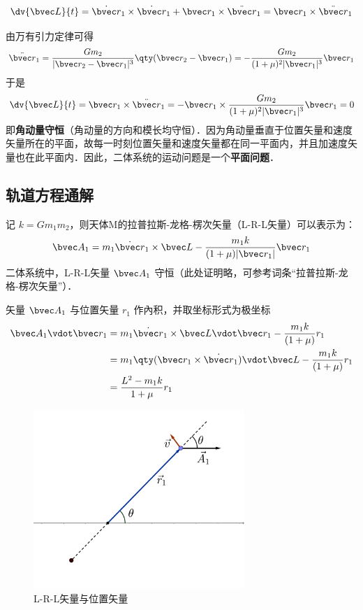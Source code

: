 \begin{equation}
\dv{\bvec L}{t} = \dot{\bvec r}_1 \times \dot{\bvec r}_1 + \bvec r_1 \times \ddot{\bvec r}_1=\bvec r_1 \times \ddot{\bvec r}_1
\end{equation}

由万有引力定律可得
\begin{equation}\label{ConDB_eq4}
\ddot{\bvec r}_1 = \frac{Gm_2}{|\bvec r_2 - \bvec r_1|^3} \qty(\bvec r_2 - \bvec r_1) = - \frac{Gm_2}{(1+\mu)^2|\bvec r_1|^3}\bvec r_1
\end{equation}
于是
\begin{equation}
\dv{\bvec L}{t} =\bvec r_1 \times \ddot{\bvec r}_1= -\bvec r_1 \times \frac{Gm_2}{(1+\mu)^2|\bvec r_1|^3}\bvec r_1= 0
\end{equation}
即\textbf{角动量守恒}（角动量的方向和模长均守恒）．因为角动量垂直于位置矢量和速度矢量所在的平面，故每一时刻位置矢量和速度矢量都在同一平面内，并且加速度矢量也在此平面内．因此，二体系统的运动问题是一个\textbf{平面问题}．

\subsection{轨道方程通解}
记 $k=Gm_1m_2$，则天体M的拉普拉斯-龙格-楞次矢量（L-R-L矢量）可以表示为：
\begin{equation}
\bvec A_1 = m_1\dot{\bvec r}_1 \times \bvec L - \frac{m_1k}{(1+\mu)|\bvec r_1|}\bvec r_1
\end{equation}
二体系统中，L-R-L矢量 $\bvec A_1$ 守恒（此处证明略，可参考词条“拉普拉斯-龙格-楞次矢量”）．

矢量 $\bvec A_1$ 与位置矢量 $r_1$ 作內积，并取坐标形式为极坐标
\begin{equation}\label{ConDB_eq7}
\begin{aligned}
\bvec A_1 \vdot \bvec r_1 &= m_1\dot{\bvec r}_1 \times \bvec L \vdot \bvec r_1 - \frac{m_1k}{(1+\mu)}r_1\\
&= m_1\qty(\bvec r_1 \times \dot{\bvec r}_1)\vdot \bvec L - \frac{m_1k}{(1+\mu)}r_1 \\
&= \frac{L^2-m_1k}{1+\mu}r_1
\end{aligned}
\end{equation}
\begin{figure}[ht]
\centering
\includegraphics[width=8cm]{./figures/ConDB1.pdf}
\caption{L-R-L矢量与位置矢量} \label{ConDB_fig1}
\end{figure}


